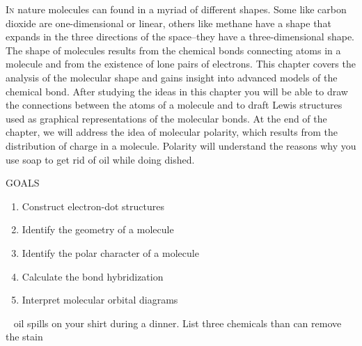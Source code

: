 \documentclass[main.tex]{subfiles}
\begin{document}
   
\lettrine[lines=4]{\color{black!45}I}{n} nature molecules can found in a myriad of different shapes. Some like carbon dioxide are one-dimensional or linear, others like methane have a shape that expands in the three directions of the space--they have a three-dimensional shape. The shape of molecules results from the chemical bonds connecting atoms in a molecule and from the existence of lone pairs of electrons. This chapter covers the analysis of the molecular shape and gains insight into advanced models of the chemical bond. After studying the ideas in this chapter you will be able to draw the connections between the atoms of a molecule and to draft Lewis structures used as graphical representations of the molecular bonds. At the end of the chapter, we will address the idea of molecular polarity, which results from the distribution of charge in a molecule. Polarity will understand the reasons why you use soap to get rid of oil while doing dished.
\begin{marginfigure}%
\begin{mytcbox}{GOALS}
\begin{enumerate}[label=\protect\circled{\color{white}\arabic*}]
\item Construct electron-dot structures
\item Identify the geometry of a molecule
\item Identify the polar character of a molecule
\item Calculate the bond hybridization 
 \item Interpret molecular orbital diagrams
\end{enumerate}
\end{mytcbox}
\vspace{1cm}

\begin{tcolorbox}[enhanced,colback=red!5!white,colframe=black!50!red,boxrule=1pt,
  arc=0pt,outer arc=0pt,drop heavy lifted shadow]
\faGears\ 
 oil spills on your shirt during a dinner. List three chemicals than can remove the stain  \end{tcolorbox}


\end{marginfigure}%
\end{document}
